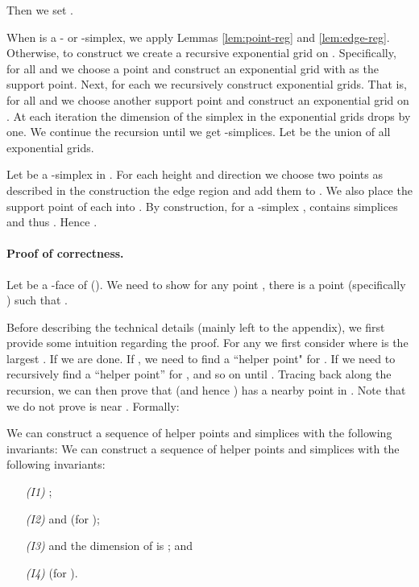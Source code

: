 \documentclass[11pt]{myclass}
\begin{document}
Then we set .

When  is a - or -simplex, we apply Lemmas \ref{lem:point-reg}  and \ref{lem:edge-reg}.  
Otherwise, to construct  we create a recursive exponential grid on .  
Specifically, for all  and  we choose a point  and construct an exponential grid  with  as the support point.  
Next, for each  we recursively construct exponential grids.  That is, for all  and  we choose another support point  and construct an exponential grid  on .  
At each iteration the dimension of the simplex in the exponential grids drops by one.  We continue the recursion until we get -simplices.  
Let  be the union of all exponential grids.  

Let  be a -simplex in .  For each height  and direction  we choose two points as described in the construction the edge region and add them to .  
We also place the support point of each  into .  
By construction, for a -simplex ,  contains  simplices and thus .  Hence .  




\paragraph{Proof of correctness.} 
Let  be a -face of  (). We need to show for any point , there is a point  (specifically ) such that .  

Before describing the technical details (mainly left to the appendix), we first provide some intuition regarding the proof.  For any  we first consider  where  is the largest .  If  we are done.  If , we need to find a ``helper point"  for .  If  we need to recursively find a ``helper point''  for , and so on until .  
Tracing back along the recursion, we can then prove that  (and hence ) has a nearby point in .
Note that we do not prove  is near .  Formally:

\begin{lemma}
\label{lem:helper}
We can construct a sequence of helper points  and simplices  with the following invariants:
We can construct a sequence of helper points  and simplices  with the following invariants:
   \begin{itemize} \denselist 
     \item[\emph{(I1)}] ;
     \item[\emph{(I2)}]  and  (for );
     \item[\emph{(I3)}]  and the dimension of  is ; and 
     \item[\emph{(I4)}]  (for ). 
   \end{itemize}
\end{lemma}
\end{document}
